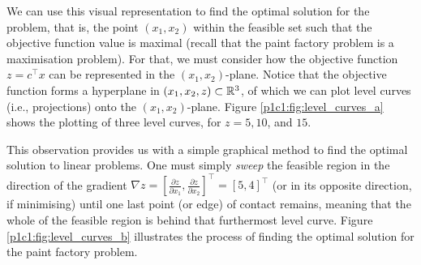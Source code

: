 We can use this visual representation to find the optimal solution for the problem, that is, the point $(x_1,x_2)$ within the feasible set such that the objective function value is maximal (recall that the paint factory problem is a maximisation problem). For that, we must consider how the objective function $z = c^\top x$ can be represented in the $(x_1, x_2)$-plane. Notice that the objective function forms a hyperplane in $(x_1, x_2, z) \subset \mathbb{R}^3$, of which we can plot level curves (i.e., projections) onto the $(x_1, x_2)$-plane. Figure \ref{p1c1:fig:level_curves_a} shows the plotting of three level curves, for $z= 5, 10$, and $15$. 

This observation provides us with a simple graphical method to find the optimal solution to linear problems. One must simply \emph{sweep} the feasible region in the direction of the gradient $\nabla z=[\frac{\partial z}{\partial x_1},\frac{\partial z}{\partial x_2}]^\top=[5,4]^\top$ (or in its opposite direction, if minimising) until one last point (or edge) of contact remains, meaning that the whole of the feasible region is behind that furthermost level curve. Figure \ref{p1c1:fig:level_curves_b} illustrates the process of finding the optimal solution for the paint factory problem.

